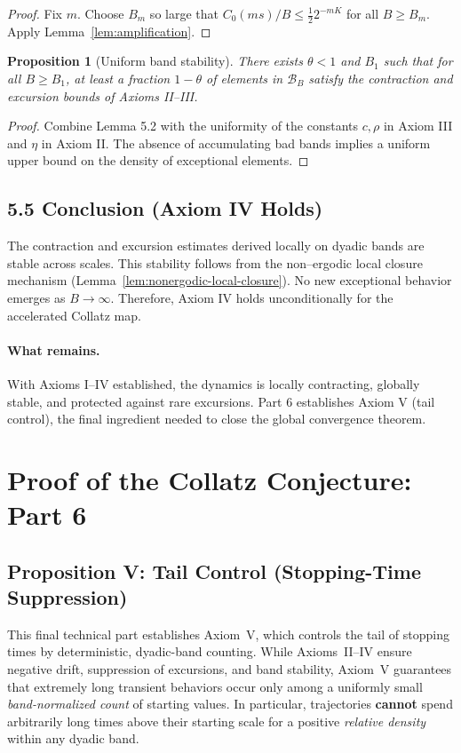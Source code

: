 \documentclass[preprint,12pt]{elsarticle}
\newtheorem{proposition}{Proposition}
\begin{document}
\begin{proof}
Fix $m$. Choose $B_m$ so large that $C_0(ms)/B \le \tfrac12 2^{-mK}$ for all $B\ge B_m$. Apply Lemma~\ref{lem:amplification}.
\end{proof}

\begin{proposition}[Uniform band stability]
There exists $\theta<1$ and $B_1$ such that for all $B\ge B_1$, at least a fraction $1-\theta$ of elements in $\mathcal{B}_B$ satisfy the contraction and excursion bounds of Axioms II–III.
\end{proposition}
\begin{proof}
Combine Lemma 5.2 with the uniformity of the constants $c,\rho$ in Axiom III and $\eta$ in Axiom II. The absence of accumulating bad bands implies a uniform upper bound on the density of exceptional elements.
\end{proof}

\subsection*{5.5 Conclusion (Axiom IV Holds)}
\label{sec:axiomIV_conclusion}
The contraction and excursion estimates derived locally on dyadic bands are stable across scales.
This stability follows from the non--ergodic local closure mechanism (Lemma~\ref{lem:nonergodic-local-closure}). No new exceptional behavior emerges as $B\to\infty$.
Therefore, Axiom IV holds unconditionally for the accelerated Collatz map.

\paragraph{What remains.}
With Axioms I–IV established, the dynamics is locally contracting, globally stable, and protected against rare excursions. Part 6 establishes Axiom V (tail control), the final ingredient needed to close the global convergence theorem.
\section{Proof of the Collatz Conjecture: Part 6}
\subsection{Proposition V: Tail Control (Stopping-Time Suppression)}
This final technical part establishes Axiom~V, which controls the tail of stopping times by deterministic, dyadic-band counting. While Axioms~II--IV ensure negative drift, suppression of excursions, and band stability, Axiom~V guarantees that extremely long transient behaviors occur only among a uniformly small \emph{band-normalized count} of starting values.
In particular, trajectories \textbf{cannot} spend arbitrarily long times above their starting scale for a positive \emph{relative density} within any dyadic band.
\end{document}
